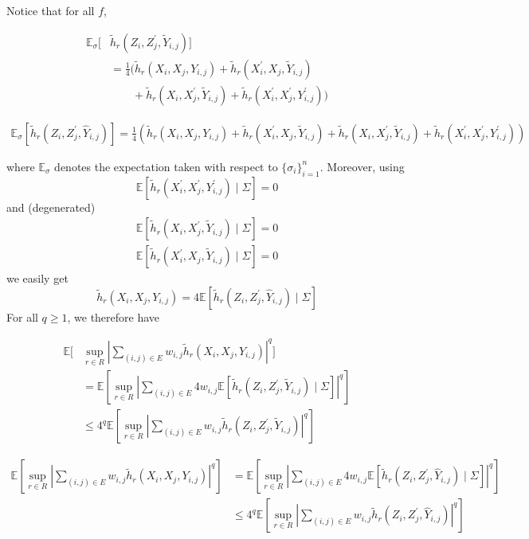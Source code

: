 \documentclass[letterpaper]{article} %
\def\DoubleColumn{}
\def\DoubleColumnEnd{}
\def\SingleColumn{}
\def\SingleColumnEnd{}
\newcommand{\E}{\mathbb{E}}
\newcommand{\pair}[1]{(#1)}
\begin{document}
    Notice that for all $f$,
    \DoubleColumn
    \begin{align*}
        \E_\sigma[&\tilde{h}_r(Z_i,Z_j^\prime,\tilde{Y}_{i,j})]\\
        &=\frac{1}{4}(\tilde{h}_r(X_i,X_j, Y_{i,j})+\tilde{h}_r(X_i^\prime,X_j,\tilde{Y}_{i,j})\\
        &\qquad+\tilde{h}_r(X_i,X_j^\prime,\tilde{Y}_{i,j})+\tilde{h}_r(X_i^\prime,X_j^\prime,Y_{i,j}^\prime))    
    \end{align*}
    \DoubleColumnEnd
    \SingleColumn
    \begin{align*}
        \E_\sigma[\tilde{h}_r(Z_i,Z_j^\prime,\hat{Y}_{i,j})]=\frac{1}{4}(\tilde{h}_r(X_i,X_j, Y_{i,j})+\tilde{h}_r(X_i^\prime,X_j,\tilde{Y}_{i,j})+\tilde{h}_r(X_i,X_j^\prime,\tilde{Y}_{i,j})+\tilde{h}_r(X_i^\prime,X_j^\prime,Y_{i,j}^\prime))    
    \end{align*}
    \SingleColumnEnd
    where $\E_\sigma$ denotes the expectation taken with respect to $\{\sigma_i\}_{i=1}^n$. Moreover, using
    \[\E[\tilde{h}_r(X_i^\prime,X_j^\prime,Y_{i,j}^\prime)\mid \Sigma]=0\]
    and (degenerated)
    \begin{align*}
        \E[\tilde{h}_r(X_i,X_j^\prime,\tilde{Y}_{i,j})\mid \Sigma] = 0\\
         \E[\tilde{h}_r(X_i^\prime,X_j,\tilde{Y}_{i,j})\mid \Sigma] = 0
    \end{align*}
    we easily get
    \[\tilde{h}_r(X_i,X_j,Y_{i,j})=4\E[\tilde{h}_r(Z_i,Z_j^\prime,\hat{Y}_{i,j})\mid \Sigma]\]
    For all $q\ge 1$, we therefore have
    \DoubleColumn
    \begin{align*}
        \E[&\sup_{r\in R}|\sum_{\pair{i,j}\in E}w_{i,j}\tilde{h}_r(X_i,X_j,Y_{i,j})|^q]\\
        &=\E[\sup_{r\in R}|\sum_{\pair{i,j}\in E}4w_{i,j}\E[\tilde{h}_r(Z_i,Z_j^\prime,\tilde{Y}_{i,j})\mid\Sigma]|^q]\\
        &\le 4^q\E[\sup_{r\in R}|\sum_{\pair{i,j}\in E}w_{i,j}\tilde{h}_r(Z_i,Z_j^\prime,\tilde{Y}_{i,j})|^q]
    \end{align*}
    \DoubleColumnEnd
    \SingleColumn
    \begin{align*}
        \E[\sup_{r\in R}|\sum_{\pair{i,j}\in E}w_{i,j}\tilde{h}_r(X_i,X_j,Y_{i,j})|^q]&=\E[\sup_{r\in R}|\sum_{\pair{i,j}\in E}4w_{i,j}\E[\tilde{h}_r(Z_i,Z_j^\prime,\hat{Y}_{i,j})\mid\Sigma]|^q]\\
        &\le 4^q\E[\sup_{r\in R}|\sum_{\pair{i,j}\in E}w_{i,j}\tilde{h}_r(Z_i,Z_j^\prime,\hat{Y}_{i,j})|^q]
    \end{align*}
\end{document}
